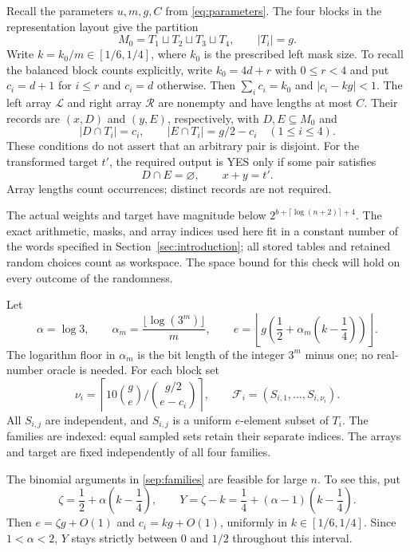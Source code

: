 Recall the parameters $u,m,g,C$ from \eqref{eq:parameters}. The four
blocks in the representation layout give the partition
\[
 M_0=T_1\sqcup T_2\sqcup T_3\sqcup T_4,\qquad |T_i|=g.
\]
Write $k=k_0/m\in[1/6,1/4]$, where $k_0$ is the prescribed left
mask size. To recall the balanced block counts explicitly, write
$k_0=4d+r$ with $0\le r<4$ and put $c_i=d+1$ for $i\le r$ and
$c_i=d$ otherwise. Then $\sum_i c_i=k_0$ and $|c_i-kg|<1$.
The left array $\mathcal L$ and right array
$\mathcal R$ are nonempty and have lengths at most $C$. Their records
are $(x,D)$ and $(y,E)$, respectively, with $D,E\subseteq M_0$ and
\begin{equation}\label{sep:cardinalities}
 |D\cap T_i|=c_i,\qquad |E\cap T_i|=g/2-c_i
 \quad(1\le i\le4).
\end{equation}
These conditions do not assert that an arbitrary pair is disjoint.
For the transformed target $t'$, the required output is YES only if some
pair satisfies
\begin{equation}\label{sep:target}
 D\cap E=\varnothing,\qquad x+y=t'.
\end{equation}
Array lengths count occurrences; distinct records are not required.

The actual weights and target have magnitude below
$2^{b+\lceil\log(n+2)\rceil+4}$. The exact arithmetic, masks, and
array indices used here fit in a constant number of the words specified
in Section~\ref{sec:introduction}; all stored tables and retained
random choices count as workspace. The space bound for this check
will hold on every outcome of the randomness.

Let
\[
 \alpha=\log 3,\qquad
 \alpha_m=\frac{\lfloor\log(3^m)\rfloor}{m},\qquad
 e=\left\lfloor g\left(\frac12+
              \alpha_m\left(k-\frac14\right)\right)\right\rfloor.
\]
The logarithm floor in $\alpha_m$ is the bit length of the integer
$3^m$ minus one; no real-number oracle is needed. For each block set
\begin{equation}\label{sep:families}
 \nu_i=\left\lceil
  10\binom{g}{e}\bigg/\binom{g/2}{e-c_i}
 \right\rceil,
 \qquad \mathcal F_i=(S_{i,1},\ldots,S_{i,\nu_i}).
\end{equation}
All $S_{i,j}$ are independent, and $S_{i,j}$ is a uniform $e$-element
subset of $T_i$. The families are indexed: equal sampled sets retain
their separate indices. The arrays and target are fixed independently
of all four families.

The binomial arguments in \eqref{sep:families} are feasible for
large $n$. To see this, put
\[
 \zeta=\frac12+\alpha\left(k-\frac14\right),\qquad
 Y=\zeta-k=\frac14+(\alpha-1)\left(k-\frac14\right).
\]
Then $e=\zeta g+O(1)$ and $c_i=kg+O(1)$, uniformly in
$k\in[1/6,1/4]$. Since $1<\alpha<2$, $Y$ stays strictly between
$0$ and $1/2$ throughout this interval.

